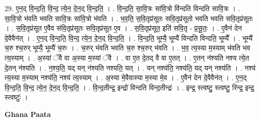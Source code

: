 \documentclass[17pt]{extarticle}
\begin{document}
29. ए॒न॒द् वि॒न्द॒ति॒ वि॒न्द॒ त्ये॒न॒ दे॒न॒द् वि॒न्द॒ति॒ । . वि॒न्द॒ति॒ सा॒वि॒त्रः सा॑वि॒त्रो वि॑न्दति विन्दति सावि॒त्रः । . सा॒वि॒त्रो भ॑वति भवति सावि॒त्रः सा॑वि॒त्रो भ॑वति । . भ॒व॒ति॒ स॒वि॒तृप्र॑सूतः सवि॒तृप्र॑सूतो भवति भवति सवि॒तृप्र॑सूतः । . स॒वि॒तृप्र॑सूत ए॒वैव स॑वि॒तृप्र॑सूतः सवि॒तृप्र॑सूत ए॒व । . स॒वि॒तृप्र॑सूत॒ इति॑ सवि॒तृ - प्र॒सू॒तः॒ । . ए॒वैन॑ देन दे॒वैवैन॑त् । . ए॒न॒द् वि॒न्द॒ति॒ वि॒न्द॒ त्ये॒न॒ दे॒न॒द् वि॒न्द॒ति॒ । . वि॒न्द॒ति॒ भूम्यै॒ भूम्यै॑ विन्दति विन्दति॒ भूम्यै᳚ । . भूम्यै॑ च॒रु श्च॒रुर् भूम्यै॒ भूम्यै॑ च॒रुः । . च॒रुर् भ॑वति भवति च॒रु श्च॒रुर् भ॑वति । . भ॒व॒ त्य॒स्या म॒स्याम् भ॑वति भव त्य॒स्याम् । . अ॒स्यां ॅवै वा अ॒स्या म॒स्यां ॅवै । . वा ए॒त दे॒तद् वै वा ए॒तत् । . ए॒तन् न॑श्यति नश्य त्ये॒त दे॒तन् न॑श्यति । . न॒श्य॒ति॒ यद् यन् न॑श्यति नश्यति॒ यत् । . यन् नश्य॑ति॒ नश्य॑ति॒ यद् यन् नश्य॑ति । . नश्य॑ त्य॒स्या म॒स्याम् नश्य॑ति॒ नश्य॑ त्य॒स्याम् । . अ॒स्या मे॒वैवास्या म॒स्या मे॒व । . ए॒वैन॑ देन दे॒वैवैन॑त् । . ए॒न॒द् वि॒न्द॒ति॒ वि॒न्द॒ त्ये॒न॒ दे॒न॒द् वि॒न्द॒ति॒ । . वि॒न्द॒तीन्द्र॒ इन्द्रो॑ विन्दति विन्द॒तीन्द्रः॑ । . इन्द्र॒ स्त्वष्टु॒ स्त्वष्टु॒ रिन्द्र॒ इन्द्र॒ स्त्वष्टुः॑ । \newline

\textbf{Ghana Paata } \newline
\end{document}
